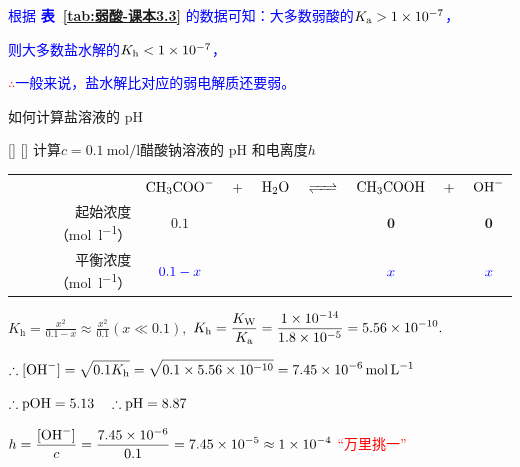             \textcolor{blue}{根据 \textbf{表~\ref{tab:弱酸-课本3.3}} 的数据可知：大多数弱酸的\(K_\text{a}>\num{1E-7}\)，}

            \textcolor{blue}{则大多数盐水解的\(K_\text{h}<\num{1E-7}\)，}

            \textcolor{red}{\(\therefore\)}\textcolor{blue}{一般来说，盐水解比对应的弱电解质还要弱。}

            如何计算盐溶液的 pH

            \begin{xmp}
                [水解常数计算盐溶液 pH 例]
                {}
                []
                []
                计算\(c=\SI{0.1}{\mole\per\litre}\)醋酸钠溶液的 pH 和电离度\(h\)
                \begin{center}
                    \begin{tabular}{r@{\quad}c@{}c@{}c@{}c@{}c@{}c@{}c}
                        & \(\mathbf{\cemh{CH3COO-}} \) & \(\mathbf{\cemh{+}}\)  & \(\mathbf{\cemh{H2O}}\)  & \(\mathbf{\cemh{<=>}} \) & \(\mathbf{\cemh{CH3COOH}} \) & \(\mathbf{\cemh{+}} \) & \(\mathbf{\cemh{OH^-}} \) \\
                        起始浓度（\si{\mole\per\litre}） & \(\mathbf{0.1}\) &&&& \(\mathbf{0}\) && \(\mathbf{0}\) \\ 
                        平衡浓度（\si{\mole\per\litre}） & \(\mathcolor{blue}{0.1-x}\) &&&& \(\mathcolor{blue}{x}\) && \(\mathcolor{blue}{x}\) \\
                    \end{tabular}
                \end{center}

                \( \displaystyle K_\text{h} = \frac{x^2}{0.1-x}\approx\frac{x^2}{0.1}(x\ll 0.1),\)
                \hfil
                \( \displaystyle K_\text{h} = \frac{K_\text{W}}{K_\text{a}}=\frac{\num{1E-14}}{\num{1.8E-5}}=\num{5.56E-10}.\)

                \( \displaystyle \therefore\cemh{[OH^-]}=\sqrt{0.1K_\text{h}}=\sqrt{0.1\times 5.56\times 10^{-10}}=\SI{7.45E-6}{\mole\per\litre} \)

                \( \therefore\cemh{pOH} = 5.13 \quad \therefore\cemh{pH} = 8.87 \) 

                \( \displaystyle h = \frac{\cemh{[OH^-]}}{c} = \frac{\num{7.45E-6}}{0.1} = \num{7.45E-5} \approx \num{1E-4} \)
                \quad \textcolor{red}{“万里挑一”}
            \end{xmp}
            

